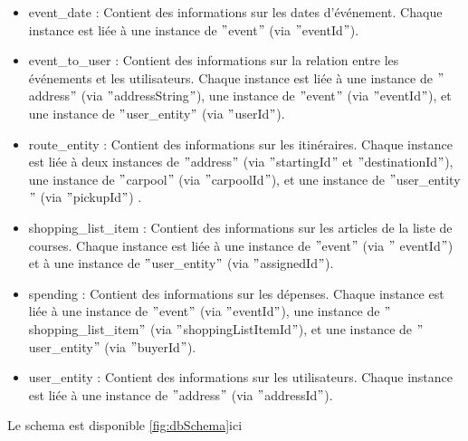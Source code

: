 \begin{itemize}
    \item event_date : Contient des informations sur les dates d'événement.
    Chaque instance est liée à une instance de \("\)event\("\) (via \("\)eventId\("\)).
    \item event_to_user : Contient des informations sur la relation entre les événements et les utilisateurs.
    Chaque instance est liée à une instance de \("\)address\("\) (via \("\)addressString\("\)), une instance de \("\)event\("\) (via \("\)eventId\("\)), et une instance de \("\)user\_entity\("\) (via \("\)userId\("\)).
    \item route_entity : Contient des informations sur les itinéraires.
    Chaque instance est liée à deux instances de \("\)address\("\) (via \("\)startingId\("\) et \("\)destinationId\("\)), une instance de \("\)carpool\("\) (via \("\)carpoolId\("\)), et une instance de \("\)user\_entity\("\) (via \("\)pickupId\("\)) .
    \item shopping_list_item : Contient des informations sur les articles de la liste de courses.
    Chaque instance est liée à une instance de \("\)event\("\) (via \("\) eventId\("\)) et à une instance de \("\)user\_entity\("\) (via \("\)assignedId\("\)).
    \item spending : Contient des informations sur les dépenses.
    Chaque instance est liée à une instance de \("\)event\("\) (via \("\)eventId\("\)), une instance de \("\)shopping\_list\_item\("\) (via \("\)shoppingListItemId\("\)), et une instance de \("\)user\_entity\("\) (via \("\)buyerId\("\)).
    \item user_entity : Contient des informations sur les utilisateurs.
    Chaque instance est liée à une instance de \("\)address\("\) (via \("\)addressId\("\)).
\end{itemize}

Le schema est disponible \ref{fig:dbSchema}ici